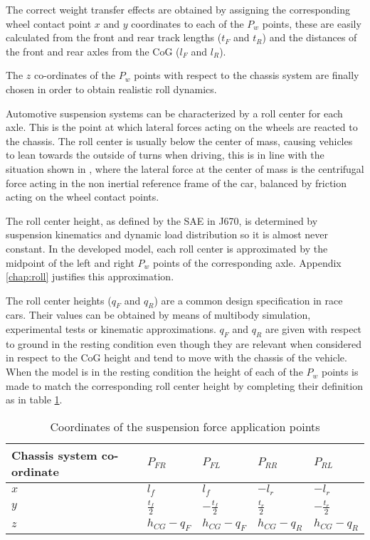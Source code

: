 The correct weight transfer effects are obtained by assigning the corresponding wheel contact point $x$ and $y$ coordinates to each of the $P_w$ points, these are easily calculated from the front and rear track lengths ($t_F$ and $t_R$) and the distances of the front and rear axles from the CoG ($l_F$ and $l_R$).

The $z$ co-ordinates of the $P_w$ points with respect to the chassis system are finally chosen in order to obtain realistic roll dynamics.

Automotive suspension systems can be characterized by a roll center for each axle. This is the point at which lateral forces acting on the wheels are reacted to the chassis.
The roll center is usually below the center of mass, causing vehicles to lean towards the outside of turns when driving, this is in line with the situation shown in , where the lateral force at the center of mass is the centrifugal force acting in the non inertial reference frame of the car, balanced by friction acting on the wheel contact points.

The roll center height, as defined by the SAE in J670, is determined by suspension kinematics and dynamic load distribution so it is almost never constant.
In the developed model, each roll center is approximated by the midpoint of the left and right $P_w$ points of the corresponding axle. Appendix \ref{chap:roll} justifies this approximation.

The roll center heights ($q_F$ and $q_R$) are a common design specification in race cars.
Their values can be obtained by means of multibody simulation, experimental tests or kinematic approximations.
$q_F$ and $q_R$  are given with respect to ground in the resting condition even though they are relevant when considered in respect to the CoG height and tend to move with the chassis of the vehicle.
When the model is in the resting condition the height of each of the $P_w$ points is made to match the corresponding roll center height by completing their definition as in table \ref{table:susppoints}.

\begin{table}[ht]
  \caption{Coordinates of the suspension force application points} %
  \centering %
  \begin{tabular}{l l l l l} %
    \hline\hline %
    Chassis system co-ordinate & $P_{FR}$ & $P_{FL}$ & $P_{RR}$ & $P_{RL}$ \\ [0.5ex] %
    \hline %
    $ x$ & $ l_f$ & $ l_f$ & $-l_r $ & $-l_r $\\ %
    $ y$ & $ \frac{t_f}{2} $ & $ -\frac{t_f}{2}$ & $ \frac{t_r}{2}$ & $ -\frac{t_r}{2}$\\ %
    $ z$ & $ h_{CG} - q_F $& $ h_{CG} - q_F $ & $ h_{CG} - q_R$ & $ h_{CG} - q_R$ \\ [1ex] %
    \hline %
  \end{tabular}
  \label{table:susppoints} %
\end{table}

